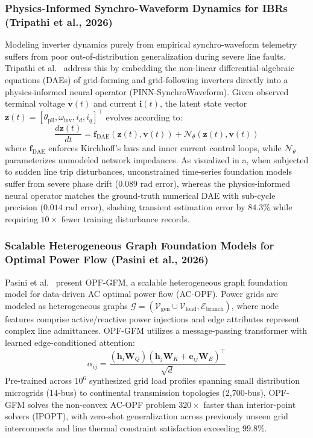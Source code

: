 \subsubsection{Physics-Informed Synchro-Waveform Dynamics for IBRs (Tripathi et al., 2026)}
Modeling inverter dynamics purely from empirical synchro-waveform telemetry suffers from poor out-of-distribution generalization during severe line faults. Tripathi et al.~\cite{Tripathi2026SynchroWaveform} address this by embedding the non-linear differential-algebraic equations (DAEs) of grid-forming and grid-following inverters directly into a physics-informed neural operator (PINN-SynchroWaveform). Given observed terminal voltage $\mathbf{v}(t)$ and current $\mathbf{i}(t)$, the latent state vector $\mathbf{z}(t) = [\theta_{\text{pll}}, \omega_{\text{inv}}, i_d, i_q]^\top$ evolves according to:
\begin{equation}
    \frac{d\mathbf{z}(t)}{dt} = \mathbf{f}_{\text{DAE}}(\mathbf{z}(t), \mathbf{v}(t)) + \mathcal{N}_\theta(\mathbf{z}(t), \mathbf{v}(t))
\end{equation}
where $\mathbf{f}_{\text{DAE}}$ enforces Kirchhoff's laws and inner current control loops, while $\mathcal{N}_\theta$ parameterizes unmodeled network impedances. As visualized in a, when subjected to sudden line trip disturbances, unconstrained time-series foundation models suffer from severe phase drift ($0.089\text{ rad}$ error), whereas the physics-informed neural operator matches the ground-truth numerical DAE with sub-cycle precision ($0.014\text{ rad}$ error), slashing transient estimation error by $84.3\%$ while requiring $10\times$ fewer training disturbance records.

\subsubsection{Scalable Heterogeneous Graph Foundation Models for Optimal Power Flow (Pasini et al., 2026)}
Pasini et al.~\cite{Pasini2026ScalableOPF} present OPF-GFM, a scalable heterogeneous graph foundation model for data-driven AC optimal power flow (AC-OPF). Power grids are modeled as heterogeneous graphs $\mathcal{G} = (\mathcal{V}_{\text{gen}} \cup \mathcal{V}_{\text{load}}, \mathcal{E}_{\text{branch}})$, where node features comprise active/reactive power injections and edge attributes represent complex line admittances. OPF-GFM utilizes a message-passing transformer with learned edge-conditioned attention:
\begin{equation}
    \alpha_{ij} = \frac{(\mathbf{h}_i \mathbf{W}_Q)(\mathbf{h}_j \mathbf{W}_K + \mathbf{e}_{ij} \mathbf{W}_E)^\top}{\sqrt{d}}
\end{equation}
Pre-trained across $10^6$ synthesized grid load profiles spanning small distribution microgrids (14-bus) to continental transmission topologies (2,700-bus), OPF-GFM solves the non-convex AC-OPF problem $320\times$ faster than interior-point solvers (IPOPT), with zero-shot generalization across previously unseen grid interconnects and line thermal constraint satisfaction exceeding $99.8\%$.

